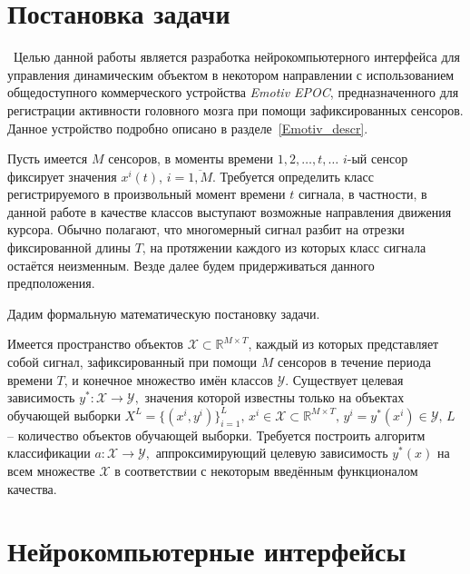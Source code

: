 \documentclass[12pt,a4paper,oneside,fleqn,leqno]{article}
\begin{document}
\clearpage 

\section{Постановка задачи}
	\quad\,\,\,Целью данной работы является разработка нейрокомпьютерного интерфейса для управления динамическим объектом в некотором направлении с использованием общедоступного коммерческого устройства {\it Emotiv EPOC}, предназначенного для регистрации активности головного мозга при помощи зафиксированных сенсоров. Данное устройство подробно описано в разделе~\ref{Emotiv_descr}.
 	\par Пусть имеется $M$ сенсоров, в моменты времени $1, 2, \dots, t, \dots$ $i$-ый сенсор фиксирует значения $x^i(t)$, $i = \overline{1,M}.$ Требуется определить класс регистрируемого в произвольный момент времени $t$ сигнала, в частности, в данной работе в качестве классов выступают возможные направления движения курсора. Обычно полагают, что многомерный сигнал разбит на отрезки фиксированной длины $T$, на протяжении каждого из которых класс сигнала остаётся неизменным. Везде далее будем придерживаться данного предположения.
	\par Дадим формальную математическую постановку задачи.
	\par Имеется пространство объектов $\mathcal{X} \subset \mathbb{R}^{M \times T}$, каждый из которых представляет собой сигнал, зафиксированный при помощи $M$ сенсоров в течение периода времени $T$, и конечное множество имён классов $\mathcal{Y}$. Существует целевая зависимость $y^*: \mathcal{X} \to \mathcal{Y},$ значения которой известны только на объектах обучающей выборки $X^L = \{ (x^i, y^i)\}_{i=1}^L, \, x^i \in \mathcal{X} \subset \mathbb{R}^{M \times T}, \, y^i = y^*(x^i) \in \mathcal{Y}, \, L$ -- количество объектов обучающей выборки. Требуется построить алгоритм классификации $a: \mathcal{X} \to \mathcal{Y},$ аппроксимирующий целевую зависимость $y^*(x)$ на всем множестве $\mathcal{X}$ в соответствии с некоторым введённым функционалом качества.

\clearpage 

\section{Нейрокомпьютерные интерфейсы}
\end{document}
